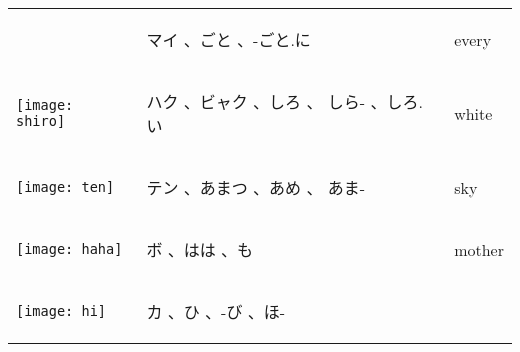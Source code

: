\documentclass[a4paper,12pt]{extarticle}
\begin{document}
\begin{longtable}{|lp{6cm}p{4cm}|}
\begin{minipage}{0.3\textwidth}
{		}
	\end{minipage}
	                                   &
	\begin{CJK}{UTF8}{min} マイ 、ごと 、-ごと.に\end{CJK}
	                                   &
	every
	\\
	\begin{minipage}{0.3\textwidth}
		\centerline{
			\texttt{[image: shiro]}
		}
	\end{minipage}
	                                   &
	\begin{CJK}{UTF8}{min} ハク 、ビャク 、しろ 、 しら- 、しろ.い\end{CJK}
	                                   &
	white
	\\
	\begin{minipage}{0.3\textwidth}
		\centerline{
			\texttt{[image: ten]}
		}
	\end{minipage}
	                                   &
	\begin{CJK}{UTF8}{min} テン 、あまつ 、あめ 、 あま-\end{CJK}
	                                   &
	sky
	\\
	\begin{minipage}{0.3\textwidth}
		\centerline{
			\texttt{[image: haha]}
		}
	\end{minipage}
	                                   &
	\begin{CJK}{UTF8}{min} ボ 、はは 、も\end{CJK}
	                                   &
	mother
	\\
	\begin{minipage}{0.3\textwidth}
		\centerline{
			\texttt{[image: hi]}
		}
	\end{minipage}
	                                   &
	\begin{CJK}{UTF8}{min} カ 、ひ 、-び 、ほ-\end{CJK}

\end{longtable}
\end{document}
